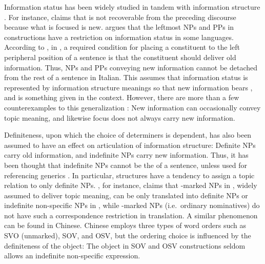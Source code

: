 Information status has been widely studied in tandem with information
structure \citep{gundel:03}.  For instance, \citet{halliday:67} claims
that  is not recoverable from the preceding discourse because
what is focused is new.  \citet{cinque:77} argues that the leftmost
NPs and PPs in  constructions have a restriction on
information status in some languages.  According to
\citeauthor{cinque:77}, in , a required condition for
placing a constituent to the left peripheral position of a sentence is
that the constituent should deliver old information. Thus, NPs and PPs
conveying new information cannot be detached from the rest of a
sentence in Italian.  This assumes that information status is
represented by information structure meanings so that new
information bears , and  is something given in the context.
However, there are more than a few counterexamples to this
generalization \citep{erteschik:07}: New information can occasionally
convey topic meaning, and likewise focus does not always carry new
information.




Definiteness, upon which the choice of determiners is dependent, has
also been assumed to have an effect on articulation of information
structure: Definite NPs carry old information, and indefinite NPs
carry new information. Thus, it has been thought that indefinite NPs
cannot be the  of a sentence, unless used for referencing
generics \citep{lambrecht:96}.  In particular, 
structures have a tendency to assign a topic relation to only definite
NPs. \citet{kuroda:72}, for instance, claims that \wa-marked NPs in
, widely assumed to deliver topic meaning, can be only
translated into definite NPs or indefinite non-specific NPs in
, while \ga-marked NPs (i.e.\ ordinary nominatives) do not have
such a correspondence restriction in translation.  A similar
phenomenon can be found in Chinese.  Chinese employs three types of
word orders such as SVO (unmarked), SOV, and OSV, but the ordering
choice is influenced by the definiteness of the object: The
 object in SOV and OSV constructions seldom allows an
indefinite non-specific expression.







